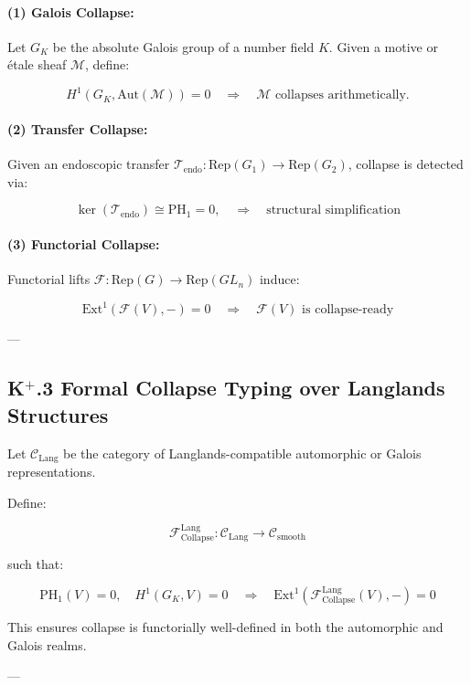 \documentclass[11pt]{article}
\begin{document}
\paragraph{(1) Galois Collapse:}
Let \( G_K \) be the absolute Galois group of a number field \( K \). Given a motive or étale sheaf \( \mathcal{M} \), define:

\[
H^1(G_K, \mathrm{Aut}(\mathcal{M})) = 0 \quad \Rightarrow \quad \mathcal{M} \text{ collapses arithmetically.}
\]

\paragraph{(2) Transfer Collapse:}
Given an endoscopic transfer \( \mathcal{T}_{\text{endo}} : \mathrm{Rep}(G_1) \to \mathrm{Rep}(G_2) \), collapse is detected via:

\[
\ker(\mathcal{T}_{\text{endo}}) \cong \mathrm{PH}_1 = 0, \quad \Rightarrow \quad \text{structural simplification}
\]

\paragraph{(3) Functorial Collapse:}
Functorial lifts \( \mathcal{F} : \mathrm{Rep}(G) \to \mathrm{Rep}(GL_n) \) induce:

\[
\mathrm{Ext}^1(\mathcal{F}(V), -) = 0 \quad \Rightarrow \quad \mathcal{F}(V) \text{ is collapse-ready}
\]

---

\subsection*{K$^{+}$.3 Formal Collapse Typing over Langlands Structures}

Let \( \mathcal{C}_{\mathrm{Lang}} \) be the category of Langlands-compatible automorphic or Galois representations.

Define:

\[
\mathcal{F}_{\mathrm{Collapse}}^{\mathrm{Lang}} : \mathcal{C}_{\mathrm{Lang}} \to \mathcal{C}_{\mathrm{smooth}}
\]

such that:

\[
\mathrm{PH}_1(V) = 0,\quad H^1(G_K, V) = 0 \quad \Rightarrow \quad \mathrm{Ext}^1(\mathcal{F}_{\mathrm{Collapse}}^{\mathrm{Lang}}(V), -) = 0
\]

This ensures collapse is functorially well-defined in both the automorphic and Galois realms.

---
\end{document}
